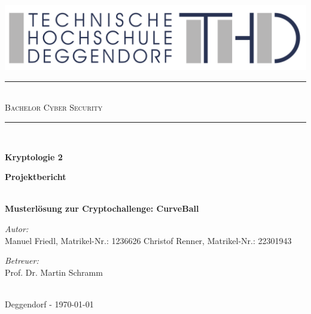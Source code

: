 \documentclass{article}
\begin{document}

\begin{titlepage}
	\begin{center}
		
        \includegraphics[width=\textwidth]{THD-Logo.pdf}
	
	    \vspace{1cm}
	
		\rule{1\textwidth}{1mm} \\[0.3cm]

		\textsc{\scshape \huge Bachelor Cyber Security}\\
		
		\rule{1\textwidth}{1mm} \\[2cm] 
		
		{ 
			 \vspace{1cm}
			 
			 \Large \textbf{Kryptologie 2}
			 
			 \vspace{3cm}
			 \Large \textbf{Projektbericht}}\\[0.5cm]
			 \LARGE \textbf{Musterlösung zur Cryptochallenge: CurveBall}\\[2cm]
		\begin{minipage}[t]{0.4\textwidth}
			\begin{flushleft} \normalsize
				\emph{Autor:}\\[0.3cm]
				
			    Manuel Friedl, Matrikel-Nr.: 1236626
			    Christof Renner, Matrikel-Nr.: 22301943
				
			\end{flushleft}
		\end{minipage}
		\begin{minipage}[t]{0.5\textwidth}
			\begin{flushright} \normalsize
				\emph{Betreuer:}\\[0.3cm]
				
    			Prof. Dr. Martin Schramm
				
			\end{flushright}
		\end{minipage}\\[3cm]
		{\large Deggendorf - \today\\}	
	\end{center}
\end{titlepage}
\end{document}
